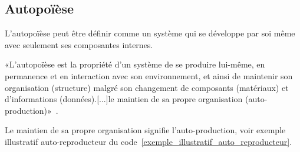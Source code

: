 

\subsection{Autopoïèse}

L'autopoïèse peut être définir comme un système qui se développe par soi même avec seulement ses composantes internes.

«L'autopoïèse est la propriété d'un système de se produire lui-même, en permanence et en interaction avec son environnement, et ainsi de maintenir son organisation (structure) malgré son changement de composants (matériaux) et d'informations (données).[...]le maintien de sa propre organisation (auto-production)»~\cite{wiki_autopoiesis_2022}.

Le maintien de sa propre organisation signifie l'auto-production, voir exemple illustratif auto-reproducteur du code~\ref{exemple_illustratif_auto_reproducteur}.

